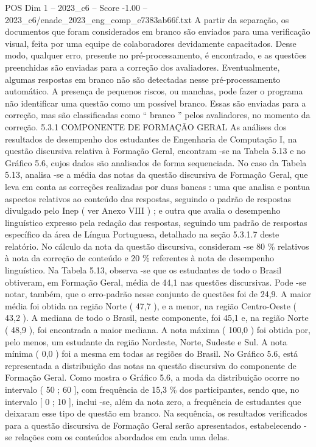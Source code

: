 \begin{textsample}{POS Dim 1 – 2023\_c6 – Score -1.00 – 2023\_c6/enade\_2023\_eng\_comp\_e7383ab66f.txt}
A partir da separação, os documentos que foram considerados em branco são enviados para uma verificação visual, feita por uma equipe de colaboradores devidamente capacitados.
Desse modo, qualquer erro, presente no pré-processamento, é encontrado, e as questões preenchidas são enviadas para a correção dos avaliadores.
Eventualmente, algumas respostas em branco não são detectadas nesse pré-processamento automático.
A presença de pequenos riscos, ou manchas, pode fazer o programa não identificar uma questão como um possível branco.
Essas são enviadas para a correção, mas são classificadas como “ branco ” pelos avaliadores, no momento da correção. 5.3.1 COMPONENTE DE FORMAÇÃO GERAL As análises dos resultados de desempenho dos estudantes de Engenharia de Computação I, na questão discursiva relativa à Formação Geral, encontram -se na Tabela 5.13 e no Gráfico 5.6, cujos dados são analisados de forma sequenciada.
No caso da Tabela 5.13, analisa -se a média das notas da questão discursiva de Formação Geral, que leva em conta as correções realizadas por duas bancas : uma que analisa e pontua aspectos relativos ao conteúdo das respostas, seguindo o padrão de respostas divulgado pelo Inep ( ver Anexo VIII ) ; e outra que avalia o desempenho linguístico expresso pela redação das respostas, seguindo um padrão de respostas específico da área de Língua Portuguesa, detalhado na seção 5.3.1.7 deste relatório.
No cálculo da nota da questão discursiva, consideram -se 80 \% relativos à nota da correção de conteúdo e 20 \% referentes à nota de desempenho linguístico.
Na Tabela 5.13, observa -se que os estudantes de todo o Brasil obtiveram, em Formação Geral, média de 44,1 nas questões discursivas.
Pode -se notar, também, que o erro-padrão nesse conjunto de questões foi de 24,9.
A maior média foi obtida na região Norte ( 47,7 ), e a menor, na região Centro-Oeste ( 43,2 ).
A mediana de todo o Brasil, neste componente, foi 45,1 e, na região Norte ( 48,9 ), foi encontrada a maior mediana.
A nota máxima ( 100,0 ) foi obtida por, pelo menos, um estudante da região Nordeste, Norte, Sudeste e Sul.
A nota mínima ( 0,0 ) foi a mesma em todas as regiões do Brasil.
No Gráfico 5.6, está representada a distribuição das notas na questão discursiva do componente de Formação Geral.
Como mostra o Gráfico 5.6, a moda da distribuição ocorre no intervalo ( 50 ; 60 ], com frequência de 15,3 \% dos participantes, sendo que, no intervalo [ 0 ; 10 ], inclui -se, além da nota zero, a frequência de estudantes que deixaram esse tipo de questão em branco.
Na sequência, os resultados verificados para a questão discursiva de Formação Geral serão apresentados, estabelecendo -se relações com os conteúdos abordados em cada uma delas.

\end{textsample}
